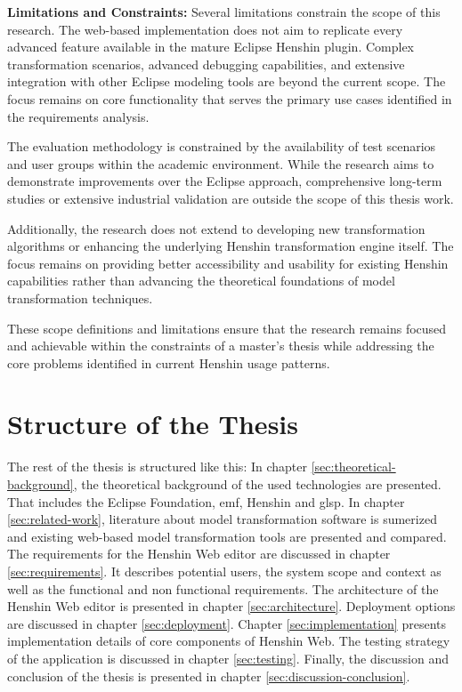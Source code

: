 \textbf{Limitations and Constraints:}
Several limitations constrain the scope of this research. The web-based implementation does not aim to replicate every advanced feature available in the mature Eclipse Henshin plugin. Complex transformation scenarios, advanced debugging capabilities, and extensive integration with other Eclipse modeling tools are beyond the current scope. The focus remains on core functionality that serves the primary use cases identified in the requirements analysis.

The evaluation methodology is constrained by the availability of test scenarios and user groups within the academic environment. While the research aims to demonstrate improvements over the Eclipse approach, comprehensive long-term studies or extensive industrial validation are outside the scope of this thesis work.

Additionally, the research does not extend to developing new transformation algorithms or enhancing the underlying Henshin transformation engine itself. The focus remains on providing better accessibility and usability for existing Henshin capabilities rather than advancing the theoretical foundations of model transformation techniques.

These scope definitions and limitations ensure that the research remains focused and achievable within the constraints of a master's thesis while addressing the core problems identified in current Henshin usage patterns.

\section{Structure of the Thesis}
\label{subsec:structure-thesis}

The rest of the thesis is structured like this: In chapter \ref{sec:theoretical-background}, the theoretical background of the used technologies are presented. That includes the Eclipse Foundation, \ac{emf}, Henshin and \ac{glsp}. In chapter \ref{sec:related-work}, literature about model transformation software is sumerized and existing web-based model transformation tools are presented and compared. The requirements for the Henshin Web editor are discussed in chapter \ref{sec:requirements}. It describes potential users, the system scope and context as well as the functional and non functional requirements. The architecture of the Henshin Web editor is presented in chapter \ref{sec:architecture}. Deployment options are discussed in chapter \ref{sec:deployment}. Chapter \ref{sec:implementation} presents implementation details of core components of Henshin Web. The testing strategy of the application is discussed in chapter \ref{sec:testing}. Finally, the discussion and conclusion of the thesis is presented in chapter \ref{sec:discussion-conclusion}.